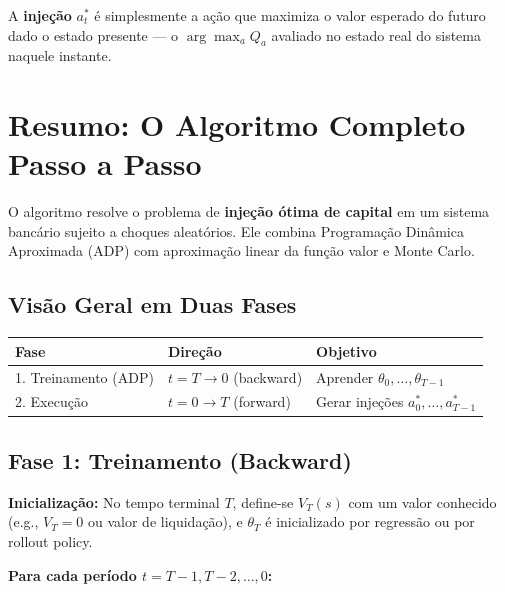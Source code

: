 \documentclass[12pt,a4paper]{article}
\begin{document}
A \textbf{injeção} $a_t^*$ é simplesmente a ação que maximiza o valor esperado do futuro dado o estado presente --- o $\arg\max_a Q_a$ avaliado no estado real do sistema naquele instante.

\section{Resumo: O Algoritmo Completo Passo a Passo}

O algoritmo resolve o problema de \textbf{injeção ótima de capital} em um sistema bancário sujeito a choques aleatórios. Ele combina Programação Dinâmica Aproximada (ADP) com aproximação linear da função valor e Monte Carlo.

\subsection{Visão Geral em Duas Fases}

\begin{center}
\begin{tabular}{lll}
\hline
\textbf{Fase} & \textbf{Direção} & \textbf{Objetivo} \\
\hline
1. Treinamento (ADP) & $t = T \to 0$ (backward) & Aprender $\theta_0, \ldots, \theta_{T-1}$ \\
2. Execução & $t = 0 \to T$ (forward) & Gerar injeções $a_0^*, \ldots, a_{T-1}^*$ \\
\hline
\end{tabular}
\end{center}

\subsection{Fase 1: Treinamento (Backward)}

\textbf{Inicialização:} No tempo terminal $T$, define-se $V_T(s)$ com um valor conhecido (e.g., $V_T = 0$ ou valor de liquidação), e $\theta_T$ é inicializado por regressão ou por rollout policy.

\textbf{Para cada período $t = T-1, T-2, \ldots, 0$:}
\end{document}
